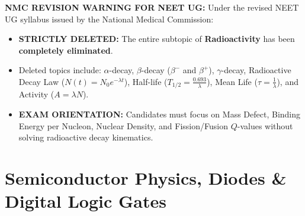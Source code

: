 \documentclass[10pt,a4paper]{article}
\begin{document}
\begin{trapbox}
\textbf{NMC REVISION WARNING FOR NEET UG:}
Under the revised NEET UG syllabus issued by the National Medical Commission:
\begin{itemize}
  \item \textbf{STRICTLY DELETED:} The entire subtopic of \textbf{Radioactivity} has been \textbf{completely eliminated}.
  \item Deleted topics include: $\alpha$-decay, $\beta$-decay ($\beta^-$ and $\beta^+$), $\gamma$-decay, Radioactive Decay Law ($N(t) = N_0 e^{-\lambda t}$), Half-life ($T_{1/2} = \frac{0.693}{\lambda}$), Mean Life ($\tau = \frac{1}{\lambda}$), and Activity ($A = \lambda N$).
  \item \textbf{EXAM ORIENTATION:} Candidates must focus on Mass Defect, Binding Energy per Nucleon, Nuclear Density, and Fission/Fusion $Q$-values without solving radioactive decay kinematics.
\end{itemize}
\end{trapbox}

\section{Semiconductor Physics, Diodes \& Digital Logic Gates}
\end{document}
